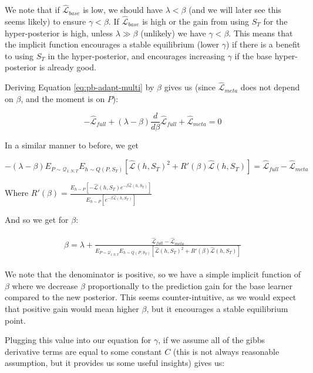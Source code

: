 \documentclass[letterpaper]{article}
\theoremstyle{definition}
\begin{document}
We note that if $\hat{\mathcal{L}}_{base}$ is low, we should have $\lambda < \beta$ (and we will later see this seems likely) to ensure $\gamma < \beta$. If $\hat{\mathcal{L}}_{base}$ is high or the gain from using $S_T$ for the hyper-posterior is high, unless $\lambda \gg \beta$ (unlikely) we have $\gamma < \beta$. This means that the implicit function encourages a stable equilibrium (lower $\gamma$) if there is a benefit to using $S_T$ in the hyper-posterior, and encourages increasing $\gamma$ if the base hyper-posterior is already good.

Deriving Equation \ref{eq:pb-adapt-multi} by $\beta$ gives us (since $\hat{\mathcal{L}}_{meta}$ does not depend on $\beta$, and the moment is on $P$):

$$-\hat{\mathcal{L}}_{full}+(\lambda-\beta)\frac{d}{d\beta}\hat{\mathcal{L}}_{full}+\hat{\mathcal{L}}_{meta}=0 $$

In a similar manner to before, we get

$$-(\lambda-\beta)E_{P\sim \mathcal{Q}_{1:N,T}}E_{h\sim Q(P,S_T)}\left [\hat{\mathcal{L}}(h,S_T)^2+R'(\beta)\hat{\mathcal{L}}(h, S_T) \right ] =\hat{\mathcal{L}}_{full}-\hat{\mathcal{L}}_{meta} $$

Where $R'(\beta)=\frac{E_{h\sim P}\left[-\hat{\mathcal{L}}(h,S_T)e^{-\beta\hat{\mathcal{L}}(h,S_T)} \right]}{E_{h\sim P}\left[e^{-\beta\hat{\mathcal{L}}(h,S_T)} \right]}$

And so we get for $\beta$:

\begin{align} 
\begin{split}
\beta = \lambda+\frac{\hat{\mathcal{L}}_{full}-\hat{\mathcal{L}}_{meta}}{E_{P\sim \mathcal{Q}_{1:N,T}}E_{h\sim Q(P,S_T)}\left [\hat{\mathcal{L}}(h,S_T)^2+R'(\beta)\hat{\mathcal{L}}(h, S_T) \right ]}
\end{split}
\end{align}

We note that the denominator is positive, so we have a simple implicit function of $\beta$ where we decrease $\beta$ proportionally to the prediction gain for the base learner compared to the new posterior. This seems counter-intuitive, as we would expect that positive gain would mean higher $\beta$, but it encourages a stable equilibrium point. 

Plugging this value into our equation for $\gamma$, if we assume all of the gibbs derivative terms are equal to some constant $C$ (this is not always reasonable assumption, but it provides us some useful insights) gives us:
\end{document}
